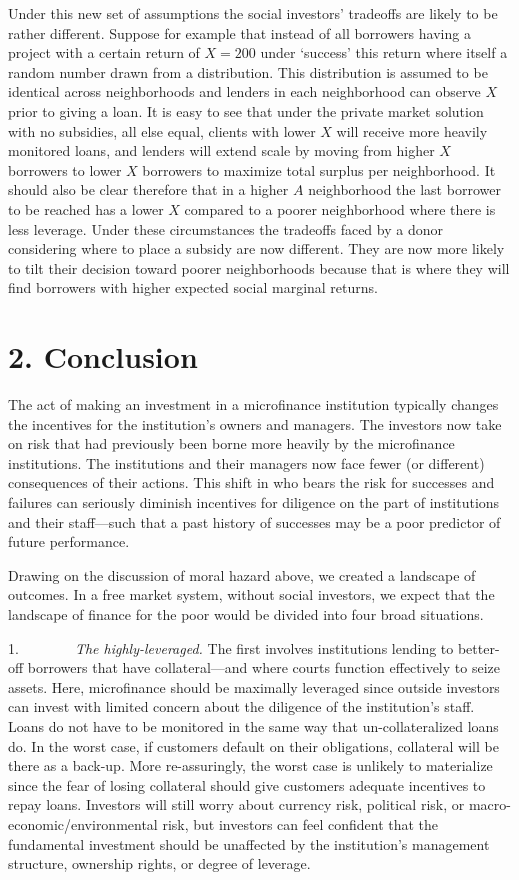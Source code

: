 \documentclass{article} %
\begin{document}
Under this new set of assumptions the social investors' tradeoffs are likely to be rather different.  Suppose for example that instead of all borrowers having a project with a certain return of $X=200$ under `success' this return where itself a random number drawn from a distribution.  This distribution is assumed to be identical across neighborhoods and lenders in each neighborhood can observe $X$ prior to giving a loan.   It is easy to see that under the private market solution with no subsidies, all else equal, clients with lower $X$ will receive more heavily monitored loans, and lenders will extend scale by moving from higher $X$ borrowers to lower $X$ borrowers to maximize total surplus per neighborhood.  It should also be clear therefore that in a higher $A\, \, $neighborhood the last borrower to be reached has a lower $X$ compared to a poorer neighborhood where there is less leverage.   Under these circumstances the tradeoffs faced by a donor considering where to place a subsidy are now different.  They are now more likely to tilt their decision toward poorer neighborhoods because that is where they will find borrowers with higher expected social marginal returns. 

\noindent 
\section{2. Conclusion}

The act of making an investment in a microfinance institution typically changes the incentives for the institution's owners and managers. The investors now take on risk that had previously been borne more heavily by the microfinance institutions. The institutions and their managers now face fewer (or different) consequences of their actions. This shift in who bears the risk for successes and failures can seriously diminish incentives for diligence on the part of institutions and their staff---such that a past history of successes may be a poor predictor of future performance. 

Drawing on the discussion of moral hazard above, we created a landscape of outcomes. In a free market system, without social investors, we expect that the landscape of finance for the poor would be divided into four broad situations. 

1.$\mathrm{\qquad }$$\mathrm{\qquad }$\textit{The highly-leveraged.} The first involves institutions lending to better-off borrowers that have collateral---and where courts function effectively to seize assets. Here, microfinance should be maximally leveraged since outside investors can invest with limited concern about the diligence of the institution's staff. Loans do not have to be monitored in the same way that un-collateralized loans do. In the worst case, if customers default on their obligations, collateral will be there as a back-up. More re-assuringly, the worst case is unlikely to materialize since the fear of losing collateral should give customers adequate incentives to repay loans. Investors will still worry about currency risk, political risk, or macro-economic/environmental risk, but investors can feel confident that the fundamental investment should be unaffected by the institution's management structure, ownership rights, or degree of leverage. 
\end{document}
